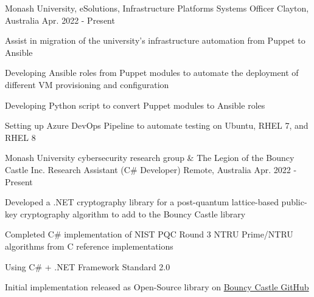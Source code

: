 

\begin{cventries}

  \cventry
  {Monash University, eSolutions, Infrastructure Platforms} %
  {Systems Officer} %
  {Clayton, Australia} %
  {Apr. 2022 - Present} %
  {
    \begin{cvitems} %
      \item {Assist in migration of the university's infrastructure automation from Puppet to Ansible}
      \item {Developing Ansible roles from Puppet modules to automate the deployment of different VM provisioning and configuration}
      \item {Developing Python script to convert Puppet modules to Ansible roles}
      \item {Setting up Azure DevOps Pipeline to automate testing on Ubuntu, RHEL 7, and RHEL 8}
    \end{cvitems}
  }

  \cventry
    {Monash University cybersecurity research group \& The Legion of the Bouncy Castle Inc.} %
    {Research Assistant (C\# Developer)} %
    {Remote, Australia} %
    {Apr. 2022 - Present} %
    {
      \begin{cvitems} %
        \item {Developed a .NET cryptography library for a post-quantum lattice-based public-key cryptography algorithm to add to the Bouncy Castle library}
        \item {Completed C\# implementation of NIST PQC Round 3 NTRU Prime/NTRU algorithms from C reference implementations}
        \item {Using C\# + .NET Framework Standard 2.0}
        \item {Initial implementation released as Open-Source library on \href{https://github.com/bcgit/bc-csharp}{Bouncy Castle GitHub}}
      \end{cvitems}
    }


\end{cventries}
\vspace{-3.0mm}